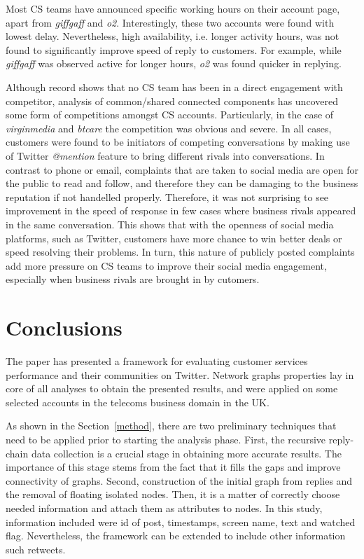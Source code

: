 \documentclass[sigconf]{acmart}
\begin{document}
Most CS teams have announced specific working hours on their account page,
apart from {\emph{giffgaff}} and {\emph{o2}}. Interestingly, these two
accounts were found with lowest delay. Nevertheless, high availability, i.e. longer 
activity hours, was not found to significantly improve speed of reply to
customers. For example, while {\emph{giffgaff}} was observed active for longer
hours, {\emph{o2}} was found quicker in replying.  

Although record shows that no CS team has been in a direct engagement with  
competitor, analysis of common/shared connected components has uncovered 
some form of competitions amongst CS accounts. Particularly, in the case
of {\emph{virginmedia}} and {\emph{btcare}} the competition was
obvious and severe. In all cases, customers were found to be initiators of
competing conversations by making use of Twitter {\emph{@mention}} feature 
to bring different rivals into conversations. In contrast to phone or
email, complaints that are taken to social media are open for the public to read and
follow, and therefore they can be damaging to the business reputation if not handelled
properly. Therefore, it was not surprising to see improvement in the speed of response 
in few cases where business rivals appeared in the same conversation. This shows that with the 
openness of social media platforms, such as Twitter, customers have more chance 
to win better deals or speed resolving their problems. In turn, this nature of publicly 
posted complaints add more pressure on CS teams to improve their social media 
engagement, especially when business rivals are brought in by cutomers.

\section{Conclusions}\label{conclusions}

The paper has presented a framework for evaluating customer services
performance and their communities on Twitter. Network graphs
properties lay in core of all analyses to obtain the presented
results, and were applied on some selected accounts in the telecoms
business domain in the UK.

As shown in the Section~\ref{method}, there are two preliminary
techniques that need to be applied prior to starting the analysis
phase. First, the recursive reply-chain data collection is a crucial
stage in obtaining more accurate results. The importance of this stage
stems from the fact that it fills the gaps and improve connectivity of
graphs. Second, construction of the initial graph from replies and the
removal of floating isolated nodes. Then, it is a matter of correctly
choose needed information and attach them as attributes to nodes. In
this study, information included were id of post, timestamps, screen
name, text and watched flag. Nevertheless, the framework can be
extended to include other information such retweets.
\end{document}
